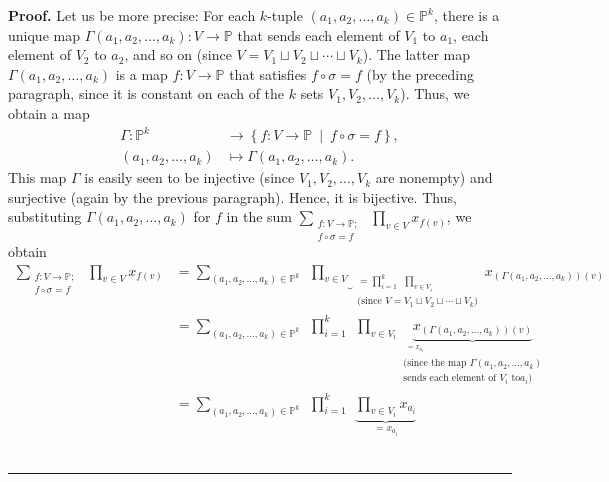 \documentclass[numbers=enddot,12pt,final,onecolumn,notitlepage]{scrartcl}%
\numberwithin{exer}{section}
\theoremstyle{definition}
\newenvironment{proof}[1][Proof]{\noindent\textbf{#1.} }{\ \rule{0.5em}{0.5em}}
\let\sumnonlimits\sum
\let\prodnonlimits\prod
\renewcommand{\sum}{\sumnonlimits\limits}
\renewcommand{\prod}{\prodnonlimits\limits}
\newenvironment{vershort}{}{}
\begin{document}
\begin{vershort}
\begin{proof}
Let us be more precise: For each $k$-tuple $\left(  a_{1},a_{2},\ldots
,a_{k}\right)  \in\mathbb{P}^{k}$, there is a unique map $\Gamma\left(
a_{1},a_{2},\ldots,a_{k}\right)  :V\rightarrow\mathbb{P}$ that sends each
element of $V_{1}$ to $a_{1}$, each element of $V_{2}$ to $a_{2}$, and so on
(since $V=V_{1}\sqcup V_{2}\sqcup\cdots\sqcup V_{k}$). The latter map
$\Gamma\left(  a_{1},a_{2},\ldots,a_{k}\right)  $ is a map $f:V\rightarrow
\mathbb{P}$ that satisfies $f\circ\sigma=f$ (by the preceding paragraph, since
it is constant on each of the $k$ sets $V_{1},V_{2},\ldots,V_{k}$). Thus, we
obtain a map%
\begin{align*}
\Gamma:\mathbb{P}^{k}  &  \rightarrow\left\{  f:V\rightarrow\mathbb{P}%
\ \mid\ f\circ\sigma=f\right\}  ,\\
\left(  a_{1},a_{2},\ldots,a_{k}\right)   &  \mapsto\Gamma\left(  a_{1}%
,a_{2},\ldots,a_{k}\right)  .
\end{align*}
This map $\Gamma$ is easily seen to be injective (since $V_{1},V_{2}%
,\ldots,V_{k}$ are nonempty) and surjective (again by the previous paragraph).
Hence, it is bijective. Thus, substituting $\Gamma\left(  a_{1},a_{2}%
,\ldots,a_{k}\right)  $ for $f$ in the sum $\sum_{\substack{f:V\rightarrow
\mathbb{P}\text{;}\\f\circ\sigma=f}}\ \ \prod_{v\in V}x_{f\left(  v\right)  }%
$, we obtain%
\begin{align}
\sum_{\substack{f:V\rightarrow\mathbb{P}\text{;}\\f\circ\sigma=f}%
}\ \ \prod_{v\in V}x_{f\left(  v\right)  }  &  =\sum_{\left(  a_{1}%
,a_{2},\ldots,a_{k}\right)  \in\mathbb{P}^{k}}\ \ \underbrace{\prod_{v\in V}%
}_{\substack{=\prod_{i=1}^{k}\ \ \prod_{v\in V_{i}}\\\text{(since }%
V=V_{1}\sqcup V_{2}\sqcup\cdots\sqcup V_{k}\text{)}}}x_{\left(  \Gamma\left(
a_{1},a_{2},\ldots,a_{k}\right)  \right)  \left(  v\right)  }\nonumber\\
&  =\sum_{\left(  a_{1},a_{2},\ldots,a_{k}\right)  \in\mathbb{P}^{k}}%
\ \ \prod_{i=1}^{k}\ \ \prod_{v\in V_{i}}\underbrace{x_{\left(  \Gamma\left(
a_{1},a_{2},\ldots,a_{k}\right)  \right)  \left(  v\right)  }}%
_{\substack{_{\substack{=x_{a_{i}}}}\\\text{(since the map }\Gamma\left(
a_{1},a_{2},\ldots,a_{k}\right)  \\\text{sends each element of }V_{i}\text{ to
}a_{i}\text{)}}}\nonumber\\
&  =\sum_{\left(  a_{1},a_{2},\ldots,a_{k}\right)  \in\mathbb{P}^{k}}%
\ \ \prod_{i=1}^{k}\ \ \underbrace{\prod_{v\in V_{i}}x_{a_{i}}}_{=x_{a_{i}%
}}
\end{align}
\end{proof}
\end{vershort}
\end{document}
